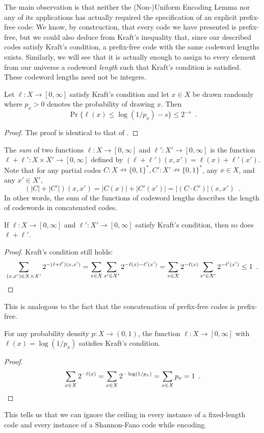 \documentclass{patmorin}
\begin{document}
The main observation is that neither the (Non-)Uniform Encoding Lemma
nor any of its applications has actually required the specification of an
explicit
prefix-free code: We know, by construction, that every code we have
presented is
prefix-free, but we could also deduce from Kraft's inequality that,
since our described codes satisfy Kraft's condition, a prefix-free
code with the same codeword lengths exists. Similarly, we will see that
it is actually enough to assign to every element from our universe
a codeword \emph{length} such that Kraft's condition is satisfied. These
codeword lengths need not be integers.

\begin{lem}
  Let $\ell : X \to [0, \infty]$ satisfy Kraft's condition and let
  $x\in X$ be drawn randomly where $p_x > 0$ denotes the probability
  of drawing $x$.  Then
  \[
    \Pr\{ \ell(x) \le \log(1/p_x)-s\} \le 2^{-s} \enspace .
  \]
\end{lem}
\begin{proof}
  The proof is identical to that of .
\end{proof}

The \emph{sum} of two functions $\ell : X \to [0, \infty]$ and
$\ell' : X' \to [0, \infty]$ is the function
$\ell + \ell' : X \times X' \to [0, \infty]$ defined by
$(\ell + \ell') (x, x') = \ell(x) + \ell'(x')$. Note that for any
partial codes
$C : X \nrightarrow \{0, 1\}^*, C' : X' \nrightarrow \{0, 1\}^*$, any
$x \in X$, and any $x' \in X'$,
\[
(|C| + |C'|)(x, x') = |C(x)| + |C'(x')| = |(C \cdot C')|(x, x') \enspace .
\]
In other words, the sum of the functions of codeword lengths describes
the length of codewords in concatenated codes.

\begin{lem}
  If $\ell : X \to [0, \infty]$ and $\ell' : X' \to [0,
  \infty]$ satisfy Kraft's condition, then so does $\ell + \ell'$.
\end{lem}
\begin{proof}
  Kraft's condition still holds:
  \[
  \sum_{(x, x') \in X \times X'} 2^{-(\ell + \ell')(x, x')} = \sum_{x
    \in X} \sum_{x' \in X'} 2^{-\ell(x) - \ell'(x')} = \sum_{x \in X}
  2^{-\ell(x)} \sum_{x' \in X'} 2^{-\ell'(x')} \leq 1 \enspace
  . \qedhere
  \]
\end{proof}
This is analogous to the fact that the concatenation of prefix-free
codes is prefix-free.

\begin{lem}
  For any probability density $p : X \to (0, 1)$, the function
  $\ell : X \to [0, \infty]$ with $\ell(x) = \log (1/p_x)$ satisfies
  Kraft's condition.
\end{lem}
\begin{proof}
  \[
  \sum_{x \in X} 2^{-\ell(x)} = \sum_{x \in X} 2^{-\log (1/p_x)} =
  \sum_{x \in X} p_x = 1 \enspace . \qedhere
  \]
\end{proof}
This tells us that we can ignore the ceiling in every instance of a
fixed-length code and every instance of a Shannon-Fano code while
encoding.
\end{document}
